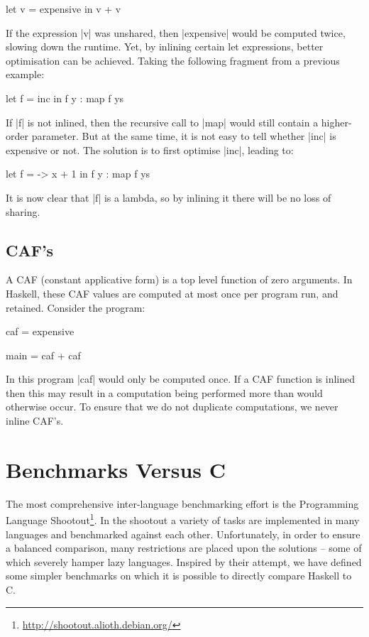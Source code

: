 \documentclass{llncs}
\begin{document}
\begin{code}
let v = expensive
in v + v
\end{code}

If the expression |v| was unshared, then |expensive| would be computed twice, slowing down the runtime. Yet, by inlining certain let expressions, better optimisation can be achieved. Taking the following fragment from a previous example:

\begin{code}
let f = inc
in f y : map f ys
\end{code}

If |f| is not inlined, then the recursive call to |map| would still contain a higher-order parameter. But at the same time, it is not easy to tell whether |inc| is expensive or not. The solution is to first optimise |inc|, leading to:

\begin{code}
let f = \x -> x + 1
in f y : map f ys
\end{code}

It is now clear that |f| is a lambda, so by inlining it there will be no loss of sharing.

\subsection{CAF's}
\label{sec:caf}

A CAF (constant applicative form) is a top level function of zero arguments. In Haskell, these CAF values are computed at most once per program run, and retained. Consider the program:

\begin{code}
caf = expensive

main = caf + caf
\end{code}

In this program |caf| would only be computed once. If a CAF function is inlined then this may result in a computation being performed more than would otherwise occur. To ensure that we do not duplicate computations, we never inline CAF's.

\section{Benchmarks Versus C}
\label{sec:c_results}

The most comprehensive inter-language benchmarking effort is the Programming Language Shootout\footnote{\url{http://shootout.alioth.debian.org/}}. In the shootout a variety of tasks are implemented in many languages and benchmarked against each other. Unfortunately, in order to ensure a balanced comparison, many restrictions are placed upon the solutions -- some of which severely hamper lazy languages. Inspired by their attempt, we have defined some simpler benchmarks on which it is possible to directly compare Haskell to C.
\end{document}
